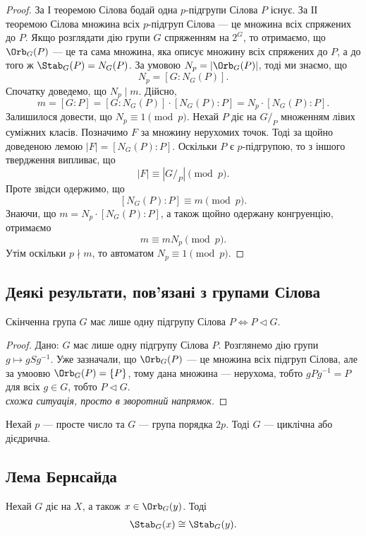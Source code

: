 \documentclass{math_library}
\begin{document}
\begin{proof}
За І теоремою Сілова бодай одна $p$-підгрупи Сілова $P$ існує. За ІІ теоремою Сілова множина всіх $p$-підгруп Сілова --- це множина всіх спряжених до $P$. Якщо розглядати дію групи $G$ спряженням на $2^G$, то отримаємо, що $\Orb_G(P)$ --- це та сама множина, яка описує множину всіх спряжених до $P$, а до того ж $\Stab_G(P) = N_G(P)$. За умовою $N_p = |\Orb_G(P)|$, тоді ми знаємо, що
\[ 
N_p = [G: N_G(P)].
\]
Спочатку доведемо, що $N_p \mid m$. Дійсно,
\[
m = [G:P] = [G:N_G(P)] \cdot [N_G(P) : P] = N_p \cdot [N_G(P) : P].
\]
Залишилося довести, що $N_p \equiv 1 \pmod p$. Нехай $P$ діє на $G/_P$ множенням лівих суміжних класів. Позначимо $F$ за множину нерухомих точок. Тоді за щойно доведеною лемою $|F| = [N_G(P) : P]$. Оскільки $P$ є $p$-підгрупою, то з іншого твердження випливає, що 
\[
|F| \equiv |G/_P| \pmod p.
\]
Проте звідси одержимо, що
\[
[N_G(P) : P] \equiv m \pmod p.
\]
Знаючи, що $m = N_p \cdot [N_G(P):P]$, а також щойно одержану конгруенцію, отримаємо
\[
m \equiv m N_p \pmod p.
\]
Утім оскільки $p \nmid m$, то автоматом $N_p \equiv 1 \pmod p$.
\end{proof}

\subsection{Деякі результати, пов'язані з групами Сілова}
\begin{proposition}
Скінченна група $G$ має лише одну підгрупу Сілова $P \iff P \triangleleft G$.
\end{proposition}

\begin{proof}
\rightproof Дано: $G$ має лише одну підгрупу Сілова $P$. Розглянемо дію групи $g \mapsto gSg^{-1}$. Уже зазначали, що $\Orb_G(P)$ --- це множина всіх підгруп Сілова, але за умоовю $\Orb_G(P) = \{P\}$, тому дана множина --- нерухома, тобто $gPg^{-1} = P$ для всіх $g \in G$, тобто $P \triangleleft G$.
\bigskip \\
\leftproof \textit{схожа ситуація, просто в зворотний напрямок}.
\end{proof}

\begin{proposition}
Нехай $p$ --- просте число та $G$ --- група порядка $2p$.
Тоді $G$ --- циклічна або дієдрична.
\end{proposition}

\subsection{Лема Бернсайда}
\begin{lemma}
Нехай $G$ діє на $X$, а також $x \in \Orb_G(y)$. Тоді
\begin{align*}
\Stab_G(x) \cong \Stab_G(y).
\end{align*}
\end{lemma}
\end{document}
